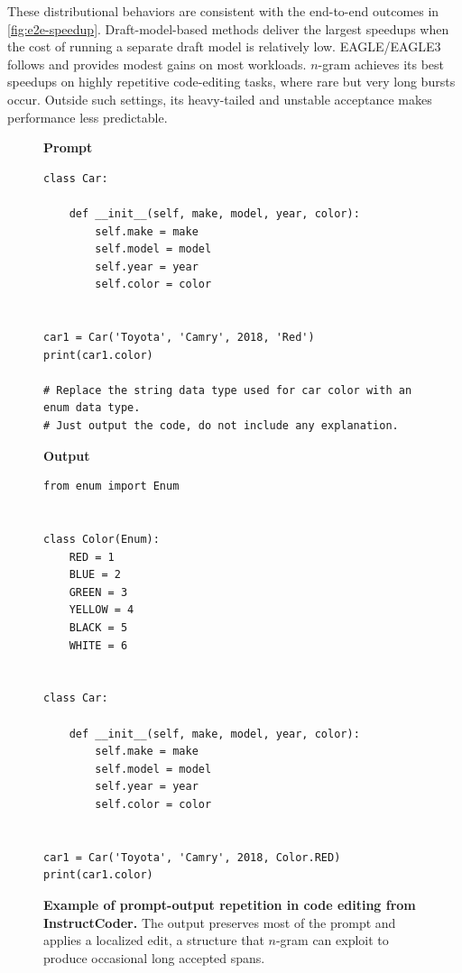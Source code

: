 These distributional behaviors are consistent with the end-to-end outcomes in \autoref{fig:e2e-speedup}. Draft-model-based methods deliver the largest speedups when the cost of running a separate draft model is relatively low. EAGLE/EAGLE3 follows and provides modest gains on most workloads. $n$-gram achieves its best speedups on highly repetitive code-editing tasks, where rare but very long bursts occur. Outside such settings, its heavy-tailed and unstable acceptance makes performance less predictable.




\begin{figure}[t]
\centering
\lstset{style=codebox, language=Python}

\begin{minipage}[t]{0.485\textwidth}
\textbf{Prompt}
\begin{lstlisting}
class Car:

    def __init__(self, make, model, year, color):
        self.make = make
        self.model = model
        self.year = year
        self.color = color


car1 = Car('Toyota', 'Camry', 2018, 'Red')
print(car1.color)

# Replace the string data type used for car color with an enum data type. 
# Just output the code, do not include any explanation.
\end{lstlisting}
\end{minipage}\hfill
\begin{minipage}[t]{0.485\textwidth}
\textbf{Output}
\begin{lstlisting}
from enum import Enum


class Color(Enum):
    RED = 1
    BLUE = 2
    GREEN = 3
    YELLOW = 4
    BLACK = 5
    WHITE = 6


class Car:

    def __init__(self, make, model, year, color):
        self.make = make
        self.model = model
        self.year = year
        self.color = color


car1 = Car('Toyota', 'Camry', 2018, Color.RED)
print(car1.color)
\end{lstlisting}
\end{minipage}

\vspace{-0.4em}
\caption{\textbf{Example of prompt-output repetition in code editing from InstructCoder.} The output preserves most of the prompt and applies a localized edit, a structure that $n$-gram can exploit to produce occasional long accepted spans.}
\label{fig:ngram_prompt_output_full}
\vspace{-1.0em}
\end{figure}
